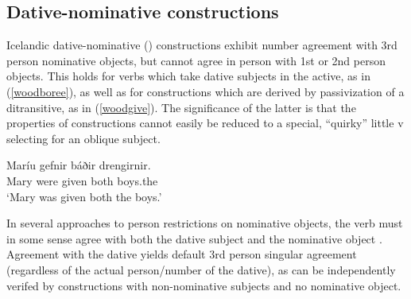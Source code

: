 \documentclass[output=paper]{langscibook}
\begin{document}
\subsection{Dative-nominative constructions} \label{wooddativ}

Icelandic dative-nominative (\datnomn) constructions exhibit number agreement with 3rd person nominative objects, but cannot agree in person with 1st or 2nd person objects. This holds for verbs which  take dative subjects in the active, as in (\ref{woodboree}), as well as for \datnom constructions which are derived by passivization of a ditransitive, as in (\ref{woodgive}). The significance of the latter is that the properties of \datnom constructions cannot easily be reduced to a special, “quirky” little v selecting for an oblique subject.

\ea \label{woodgive}
\ea[]%
{
    \gll Maríu  gefnir báðir drengirnir. \\
        Mary\dat{} were given both boys.the\nom{} \\
    \glt `Mary was given both the boys.'
}
\z
{} %
\z

\ea \label{woodboree}
    \z
\z
\begin{sloppypar}\noindent
In several approaches to person restrictions on nominative objects, the verb must in some sense agree with both the dative subject and the nominative object  \citep{Boeckx:2000kf,Schutze:2003mh,Koopman:2006zp,SigurTHsson:2008dm,Ussery:2009jd}. Agreement with the dative yields default 3rd person singular agreement (regardless of the actual person/number of the dative), as can be independently verifed by constructions with non-nominative subjects and no nominative object.\end{sloppypar}
\end{document}
